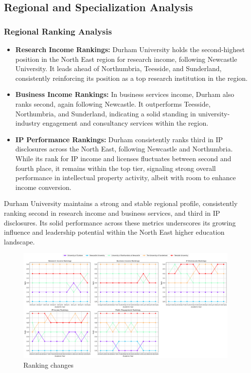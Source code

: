 \documentclass[journal,onecolumn, 10pt,draftclsnofoot]{IEEEtran}
\begin{document}
\subsection{Regional and Specialization Analysis}
\label{sec:regional-analysis}

\subsubsection{Regional Ranking Analysis}

\begin{itemize}
    \item \textbf{Research Income Rankings:} Durham University holds the second-highest position in the North East region for research income, following Newcastle University. It leads ahead of Northumbria, Teesside, and Sunderland, consistently reinforcing its position as a top research institution in the region.
    
    \item \textbf{Business Income Rankings:} In business services income, Durham also ranks second, again following Newcastle. It outperforms Teesside, Northumbria, and Sunderland, indicating a solid standing in university-industry engagement and consultancy services within the region.
    
    \item \textbf{IP Performance Rankings:} Durham consistently ranks third in IP disclosures across the North East, following Newcastle and Northumbria. While its rank for IP income and licenses fluctuates between second and fourth place, it remains within the top tier, signaling strong overall performance in intellectual property activity, albeit with room to enhance income conversion.
\end{itemize}

Durham University maintains a strong and stable regional profile, consistently ranking second in research income and business services, and third in IP disclosures. Its solid performance across these metrics underscores its growing influence and leadership potential within the North East higher education landscape.


\begin{figure}[h]
\centering
\includegraphics[width=0.99\textwidth]{Fig/figure35.ranking_changes.png}
\caption{Ranking changes}
\label{fig:ranking-changes}
\end{figure}
\end{document}
